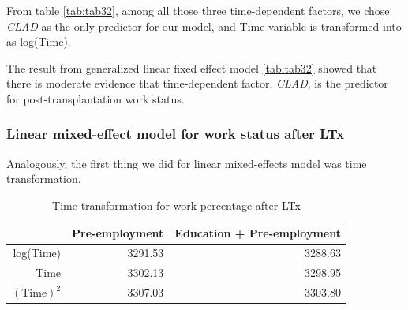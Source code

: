 \documentclass[11pt, a4paper]{article}\usepackage[]{graphicx}\usepackage[]{color}
\begin{document}
{From table \ref{tab:tab32}, among all those three time-dependent factors, we chose \textit{CLAD} as the only predictor for our model, and Time variable is transformed into as log(Time).




\begin{table}[ht]
\centering
\caption{Result for Generalized Linear Mixed-effects Model 
for Post-LTx Work Status} 
\label{tab:tab32}
\end{table}



The result from generalized linear fixed effect model \ref{tab:tab32} showed that there is moderate evidence that time-dependent factor, \textit{CLAD}, is the predictor for post-transplantation work status.  



\clearpage
\subsubsection*{Linear mixed-effect model for work status after LTx}\label{subsubsec:LMM}

Analogously, the first thing we did for linear mixed-effects model was time transformation.

\begin{table}[ht]
\centering
\caption{Time transformation for work percentage after LTx} 
\label{tab:tab29}
\begin{tabular}{rrr}
  \hline
 & Pre-employment & Education + Pre-employment \\ 
  \hline
log(Time) & 3291.53 & 3288.63 \\ 
  Time & 3302.13 & 3298.95 \\ 
  $(\mathrm{Time})^2$ & 3307.03 & 3303.80 \\ 
   \hline
\end{tabular}
\end{table}


}
\end{document}
